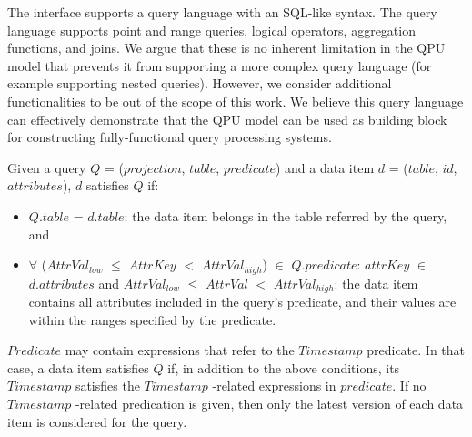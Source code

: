 The interface supports a query language with an SQL-like syntax.
The query language supports point and range queries, logical operators, aggregation functions, and joins.
We argue that these is no inherent limitation in the QPU model that prevents it from supporting a more complex
query language (for example supporting nested queries).
However, we consider additional functionalities to be out of the scope of this work.
We believe this query language can effectively demonstrate that the QPU model can be used as building
block for constructing fully-functional query processing systems.






Given a query $Q$ = ($projection$, $table$, $predicate$)
and a data item $d$ = ($table$, $id$, $attributes$), $d$ satisfies $Q$ if:
\begin{itemize}
  \item $Q.table$ = $d.table$: the data item belongs in the table referred by the query, and
  \item $\forall$ ($AttrVal_{low}$ $\leq$ $AttrKey$ $<$ $AttrVal_{high}$) $\in$ $Q.predicate$:
  $attrKey$ $\in$ $d.attributes$ and $AttrVal_{low}$ $\leq$ $AttrVal$ $<$ $AttrVal_{high}$:
  the data item contains all attributes included in the query's predicate, and their values are within the ranges
  specified by the predicate.
\end{itemize}

$Predicate$ may contain expressions that refer to the $Timestamp$ predicate.
In that case, a data item satisfies $Q$ if, in addition to the above conditions, its $Timestamp$ satisfies the
$Timestamp$ -related expressions in $predicate$.
If no $Timestamp$ -related predication is given, then only the latest version of each data item is considered for the
query.

